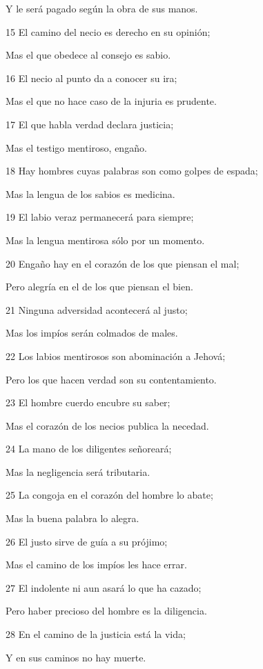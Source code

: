 \par Y le será pagado según la obra de sus manos. 
\par 15 El camino del necio es derecho en su opinión;
\par Mas el que obedece al consejo es sabio.
\par 16 El necio al punto da a conocer su ira;
\par Mas el que no hace caso de la injuria es prudente.
\par 17 El que habla verdad declara justicia;
\par Mas el testigo mentiroso, engaño.
\par 18 Hay hombres cuyas palabras son como golpes de espada;
\par Mas la lengua de los sabios es medicina.
\par 19 El labio veraz permanecerá para siempre;
\par Mas la lengua mentirosa sólo por un momento.
\par 20 Engaño hay en el corazón de los que piensan el mal;
\par Pero alegría en el de los que piensan el bien.
\par 21 Ninguna adversidad acontecerá al justo;
\par Mas los impíos serán colmados de males.
\par 22 Los labios mentirosos son abominación a Jehová;
\par Pero los que hacen verdad son su contentamiento.
\par 23 El hombre cuerdo encubre su saber;
\par Mas el corazón de los necios publica la necedad.
\par 24 La mano de los diligentes señoreará;
\par Mas la negligencia será tributaria.
\par 25 La congoja en el corazón del hombre lo abate;
\par Mas la buena palabra lo alegra.
\par 26 El justo sirve de guía a su prójimo;
\par Mas el camino de los impíos les hace errar.
\par 27 El indolente ni aun asará lo que ha cazado;
\par Pero haber precioso del hombre es la diligencia.
\par 28 En el camino de la justicia está la vida;
\par Y en sus caminos no hay muerte.

